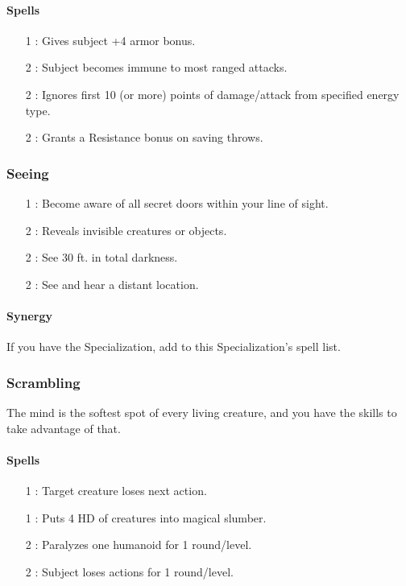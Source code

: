 \paragraph{Spells}
\begin{itemize}
 \item[1] : Gives subject +4 armor bonus.
 \item[2] : Subject becomes immune to most ranged attacks.
 \item[2] : Ignores first 10 (or more) points of damage/attack from specified energy type.
 \item[2] : Grants a Resistance bonus on saving throws.
\end{itemize}

\subsubsection{Seeing}
\begin{itemize}
 \item[1] : Become aware of all secret doors within your line of sight.
 \item[2] : Reveals invisible creatures or objects.
 \item[2] : See 30 ft. in total darkness.
 \item[2] : See and hear a distant location.
\end{itemize}
\paragraph{Synergy}
If you have the  Specialization, add  to this Specialization's spell list.

\subsubsection{Scrambling}
\label{Spec:Scrambling}
The mind is the softest spot of every living creature, and you have the skills to take advantage of that.
\paragraph{Spells}
\begin{itemize}
 \item[1] : Target creature loses next action.
 \item[1] : Puts 4 HD of creatures into magical slumber.
 \item[2] : Paralyzes one humanoid for 1 round/level.
 \item[2] : Subject loses actions for 1 round/level.
\end{itemize}

